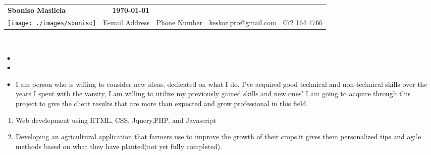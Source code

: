 %
\\ \\

\begin{tabular*}{6.5in}{l@{\extracolsep{\fill}}r}
\textbf{\Large } \textbf{Sboniso Masilela} & \textbf{\today} \\
\texttt{[image: ./images/sboniso]} & E-mail
Address & Phone Number & {\color{green}keskor.pro@gmail.com} & {\color{g}072 164 4766}
\end{tabular*}
\\

\begin{itemize}

\item {}

\item {}

\end{itemize}


\begin{itemize}
 \item %
 I am person who is willing to consider new ideas, dedicated on what I do, I've acquired good technical and non-technical skills
 over the years I spent with the varsity, I am willing to utilize my previously gained skills and new ones' I am going to acquire through
 this project to give the client results that are more than expected and grow professional in this field.
\end{itemize}



\begin{enumerate}
 \item Web development using HTML, CSS, Jquery,PHP, and Javascript 
 \item Developing an agricultural application that farmers use to improve the growth of their crops,it gives them personalized tips
 and agile methods based on what they have planted(not yet fully completed).

\end{enumerate}

